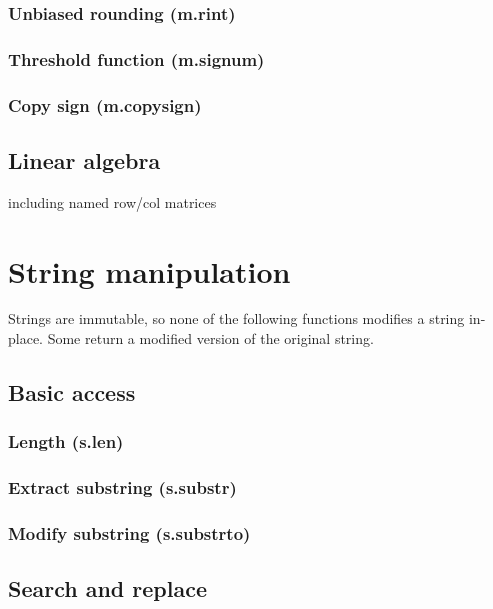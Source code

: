 \documentclass{article}
\theoremstyle{definition}
\begin{document}
\subsubsection{Unbiased rounding (m.rint)}

\subsubsection{Threshold function (m.signum)}

\subsubsection{Copy sign (m.copysign)}

\subsection{Linear algebra}

including named row/col matrices

\pagebreak

\section{String manipulation}

Strings are immutable, so none of the following functions modifies a string in-place.  Some return a modified version of the original string.

\subsection{Basic access}

\subsubsection{Length (s.len)}

\subsubsection{Extract substring (s.substr)}

\subsubsection{Modify substring (s.substrto)}

\subsection{Search and replace}
\end{document}
